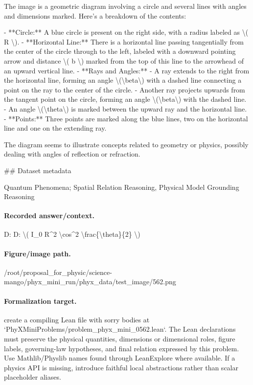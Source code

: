 The image is a geometric diagram involving a circle and several lines with angles and dimensions marked. Here's a breakdown of the contents:

- **Circle:** A blue circle is present on the right side, with a radius labeled as \textbackslash{}( R \textbackslash{}).
- **Horizontal Line:** There is a horizontal line passing tangentially from the center of the circle through to the left, labeled with a downward pointing arrow and distance \textbackslash{}( b \textbackslash{}) marked from the top of this line to the arrowhead of an upward vertical line.
- **Rays and Angles:**
  - A ray extends to the right from the horizontal line, forming an angle \textbackslash{}(\textbackslash{}beta\textbackslash{}) with a dashed line connecting a point on the ray to the center of the circle.
  - Another ray projects upwards from the tangent point on the circle, forming an angle \textbackslash{}(\textbackslash{}beta\textbackslash{}) with the dashed line.
  - An angle \textbackslash{}(\textbackslash{}theta\textbackslash{}) is marked between the upward ray and the horizontal line.
- **Points:** Three points are marked along the blue lines, two on the horizontal line and one on the extending ray.

The diagram seems to illustrate concepts related to geometry or physics, possibly dealing with angles of reflection or refraction.

\#\# Dataset metadata

Quantum Phenomena; Spatial Relation Reasoning, Physical Model Grounding Reasoning

\paragraph{Recorded answer/context.}
D: D: \textbackslash{}( I\_0 R\textasciicircum{}2 \textbackslash{}cos\textasciicircum{}2 \textbackslash{}frac\{\textbackslash{}theta\}\{2\} \textbackslash{})

\paragraph{Figure/image path.}
/root/proposal\_for\_physic/science-mango/phyx\_mini\_run/phyx\_data/test\_image/562.png

\paragraph{Formalization target.}
create a compiling Lean file with sorry bodies at `PhyXMiniProblems/problem\_phyx\_mini\_0562.lean`. The Lean declarations must preserve the physical quantities, dimensions or dimensional roles, figure labels, governing-law hypotheses, and final relation expressed by this problem.
Use Mathlib/Physlib names found through LeanExplore where available. If a physics API is missing, introduce faithful local abstractions rather than scalar placeholder aliases.


